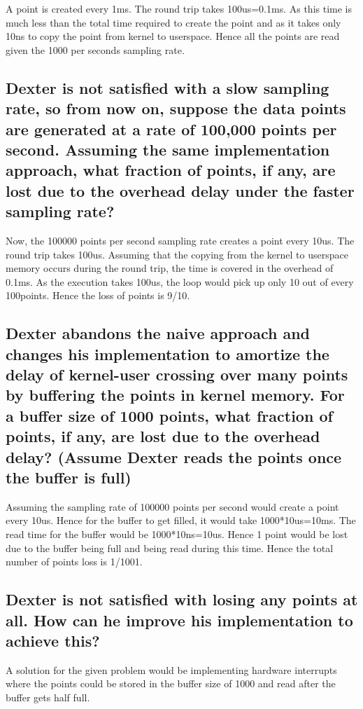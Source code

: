 \documentclass[letterpaper,10pt]{article}
\begin{document}
A point is created every 1ms. The round trip takes 100us=0.1ms. As this time is much less than the
total time required to create the point and as it takes only 10ns to copy the point from kernel to
userspace. Hence all the points are read given the 1000 per seconds sampling rate.

\subsection{Dexter is not satisfied with a slow sampling rate, so from now on, suppose the data
points are generated at a rate of 100,000 points per second. Assuming the same implementation
approach, what fraction of points, if any, are lost due to the overhead delay under the faster
sampling rate?
}

Now, the 100000 points per second sampling rate creates a point every 10us. The round trip takes
100us. Assuming that the copying from the kernel to userspace memory occurs during the round trip,
the time is covered in the overhead of 0.1ms. As the execution takes 100us, the loop would pick up
only 10 out of every 100points. Hence the loss of points is 9/10.

\subsection{Dexter abandons the naive approach and changes his implementation to amortize the
delay of kernel-user crossing over many points by buffering the points in kernel memory. For a
buffer size of 1000 points, what fraction of points, if any, are lost due to the overhead delay?
(Assume Dexter reads the points once the buffer is full)
}

Assuming the sampling rate of 100000 points per second would create a point every 10us. Hence for
the buffer to get filled, it would take 1000*10us=10ms. The read time for the buffer would be
1000*10ns=10us. Hence 1 point would be lost due to the buffer being full and being read during this
time. Hence the total number of points loss is 1/1001.

\subsection{Dexter is not satisfied with losing any points at all. How can he improve his implementation to achieve this?
}

A solution for the given problem would be implementing hardware interrupts where the points could
be stored in the buffer size of 1000 and read after the buffer gets half full.
\end{document}
